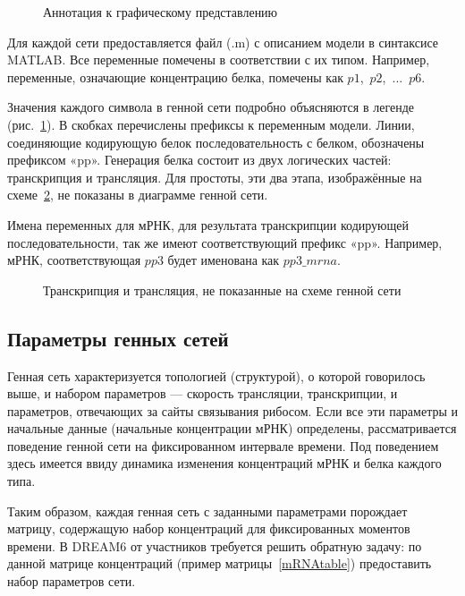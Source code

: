 \begin{figure}[h]
  \caption{Аннотация к графическому представлению}
  \label{img:GrnImageDesc}
\end{figure}

Для каждой сети предоставляется файл (.m) с описанием модели в 
синтаксисе MATLAB. Все переменные помечены в соответствии с их типом. 
Например, переменные, означающие концентрацию белка, помечены как 
$p1$,~$p2$,~...~$p6$. 

Значения каждого символа в генной сети подробно 
объясняются в легенде (рис.~\ref{img:GrnImageDesc}). В скобках перечислены 
префиксы к переменным модели. Линии, соединяющие кодирующую белок 
последовательность с белком, обозначены префиксом «pp». Генерация белка состоит 
из двух логических частей: транскрипция и трансляция. Для простоты, эти два 
этапа, изображённые на схеме~\ref{img:GrnImageTT}, не показаны в диаграмме 
генной сети. 

Имена переменных для мРНК, для результата транскрипции кодирующей 
последовательности, так же имеют соответствующий префикс «pp». Например, мРНК, 
соответствующая $pp3$ будет именована как $pp3\_mrna$.

\begin{figure}[h]
  \caption{Транскрипция и трансляция, не показанные на схеме генной сети}
  \label{img:GrnImageTT}
\end{figure}

\subsection{Параметры генных сетей} \label{s2_3}

Генная сеть характеризуется топологией (структурой), о которой говорилось выше, 
и набором параметров — скорость трансляции, транскрипции, и параметров, 
отвечающих за сайты связывания рибосом. Если все эти параметры и начальные 
данные (начальные концентрации мРНК) определены, рассматривается поведение 
генной сети на фиксированном интервале времени. Под поведением здесь имеется 
ввиду динамика изменения концентраций мРНК и белка каждого типа.

Таким образом, каждая генная сеть с заданными параметрами порождает матрицу, 
содержащую набор концентраций для фиксированных моментов времени. В DREAM6 от
участников требуется решить обратную задачу: по данной матрице концентраций 
(пример матрицы~\ref{mRNAtable}) предоставить набор параметров сети.

